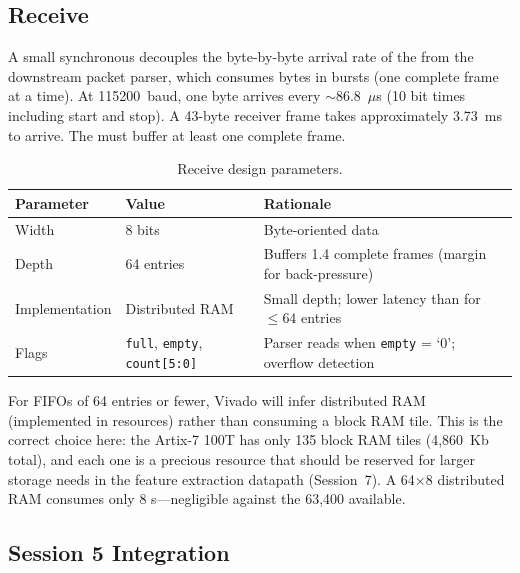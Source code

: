 \documentclass[11pt,letterpaper]{article}
\begin{document}
	\subsection{Receive \FIFO{}}

	A small synchronous \FIFO{} decouples the byte-by-byte arrival rate of the \UART{} from the downstream packet parser, which consumes bytes in bursts (one complete frame at a time). At 115200~baud, one byte arrives every $\sim$86.8~$\mu$s (10 bit times including start and stop). A 43-byte receiver frame takes approximately 3.73~ms to arrive. The \FIFO{} must buffer at least one complete frame.

	\begin{table}[ht!]
		\centering
		\caption{Receive \FIFO{} design parameters.}
		\label{tab:fifo_params}
		\renewcommand{\arraystretch}{1.3}
		\begin{tabular}{l l l}
			\toprule
			\textbf{Parameter} & \textbf{Value} & \textbf{Rationale} \\
			\midrule
			Width & 8 bits & Byte-oriented data \\
			Depth & 64 entries & Buffers 1.4 complete frames (margin for back-pressure) \\
			Implementation & Distributed RAM & Small depth; lower latency than \BRAM{} for $\leq 64$ entries \\
			Flags & \texttt{full}, \texttt{empty}, \texttt{count[5:0]} & Parser reads when \texttt{empty} = `0'; overflow detection \\
			\bottomrule
		\end{tabular}
	\end{table}

	\begin{tcolorbox}[infobox={Design Choice: Distributed RAM vs.\ Block RAM}]
		For FIFOs of 64 entries or fewer, Vivado will infer distributed RAM (implemented in \LUT{} resources) rather than consuming a block RAM tile. This is the correct choice here: the Artix-7 100T has only 135 block RAM tiles (4,860~Kb total), and each one is a precious resource that should be reserved for larger storage needs in the feature extraction datapath (Session~7). A 64$\times$8 distributed RAM \FIFO{} consumes only 8 \LUT{}s---negligible against the 63,400 available.
	\end{tcolorbox}

	\subsection{Session 5 Integration}
\end{document}
